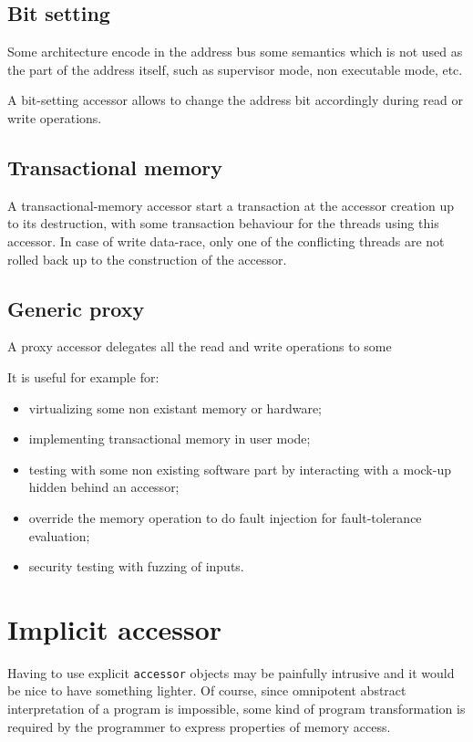 \documentclass[a4paper]{article}
\begin{document}
\subsection{Bit setting}
\label{sec:bit-setting}

Some architecture encode in the address bus some semantics which is
not used as the part of the address itself, such as supervisor mode,
non executable mode, etc.

A bit-setting accessor allows to change the address bit accordingly
during read or write operations.


\subsection{Transactional memory}
\label{sec:transactional-memory}

A transactional-memory accessor start a transaction at the accessor
creation up to its destruction, with some transaction behaviour for
the threads using this accessor. In case of write data-race, only one
of the conflicting threads are not rolled back up to the construction
of the accessor.


\subsection{Generic proxy}
\label{sec:generic-proxy}

A proxy accessor delegates all the read and write operations to some 

It is useful for example for:
\begin{itemize}
\item virtualizing some non existant memory or hardware;
\item implementing transactional memory in user mode;
\item testing with some non existing software part by interacting with
  a mock-up hidden behind an accessor;
\item override the memory operation to do fault injection for
  fault-tolerance evaluation;
\item security testing with fuzzing of inputs.
\end{itemize}


\section{Implicit accessor}
\label{sec:implicit-accessor}

Having to use explicit \texttt{accessor} objects may be painfully
intrusive and it would be nice to have something lighter. Of course,
since omnipotent abstract interpretation of a program is impossible,
some kind of program transformation is required by the programmer to
express properties of memory access.
\end{document}
